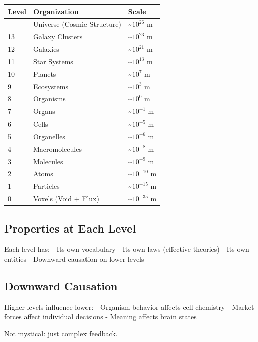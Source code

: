 \documentclass[
  11pt,
  letterpaper,
  twoside,
  openright]{book}
\begin{document}
\begin{longtable}[]{@{}lll@{}}
\toprule\noalign{}
Level & Organization & Scale \\
\midrule\noalign{}
\endhead
\bottomrule\noalign{}
\endlastfoot
14 & Universe (Cosmic Structure) & \textasciitilde{}\(10^{26}\) m \\
13 & Galaxy Clusters & \textasciitilde{}\(10^{23}\) m \\
12 & Galaxies & \textasciitilde{}\(10^{21}\) m \\
11 & Star Systems & \textasciitilde{}\(10^{13}\) m \\
10 & Planets & \textasciitilde{}\(10^{7}\) m \\
9 & Ecosystems & \textasciitilde{}\(10^{3}\) m \\
8 & Organisms & \textasciitilde{}\(10^{0}\) m \\
7 & Organs & \textasciitilde{}\(10^{-1}\) m \\
6 & Cells & \textasciitilde{}\(10^{-5}\) m \\
5 & Organelles & \textasciitilde{}\(10^{-6}\) m \\
4 & Macromolecules & \textasciitilde{}\(10^{-8}\) m \\
3 & Molecules & \textasciitilde{}\(10^{-9}\) m \\
2 & Atoms & \textasciitilde{}\(10^{-10}\) m \\
1 & Particles & \textasciitilde{}\(10^{-15}\) m \\
0 & Voxels (Void + Flux) & \textasciitilde{}\(10^{-35}\) m \\
\end{longtable}

\subsection{Properties at Each Level}\label{properties-at-each-level}

Each level has: - Its own vocabulary - Its own laws (effective theories)
- Its own entities - Downward causation on lower levels

\subsection{Downward Causation}\label{downward-causation}

Higher levels influence lower: - Organism behavior affects cell
chemistry - Market forces affect individual decisions - Meaning affects
brain states

Not mystical: just complex feedback.
\end{document}

